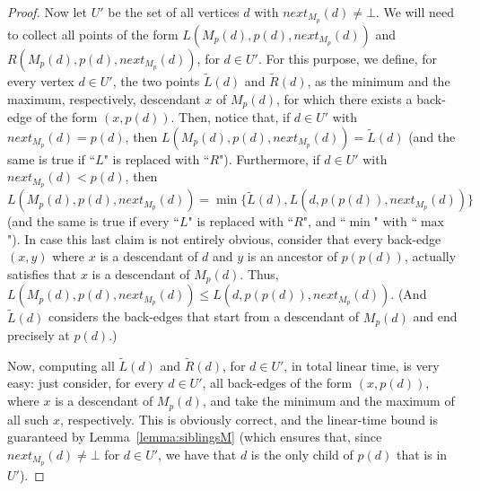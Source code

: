 \documentclass[11pt,a4paper]{article}
\begin{document}
\begin{proof}
Now let $U'$ be the set of all vertices $d$ with $\mathit{next}_{M_p}(d)\neq\bot$. We will need to collect all points of the form $L(M_p(d),p(d),\mathit{next}_{M_p}(d))$ and $R(M_p(d),p(d),\mathit{next}_{M_p}(d))$, for $d\in U'$. For this purpose, we define, for every vertex $d\in U'$, the two points $\widetilde{L}(d)$ and $\widetilde{R}(d)$, as the minimum and the maximum, respectively, descendant $x$ of $M_p(d)$, for which there exists a back-edge of the form $(x,p(d))$. Then, notice that, if $d\in U'$ with $\mathit{next}_{M_p}(d)=p(d)$, then $L(M_p(d),p(d),\mathit{next}_{M_p}(d))=\widetilde{L}(d)$ (and the same is true if  ``$L$" is replaced with ``$R$"). Furthermore, if $d\in U'$ with $\mathit{next}_{M_p}(d)<p(d)$, then $L(M_p(d),p(d),\mathit{next}_{M_p}(d))=\min\{\widetilde{L}(d), L(d,p(p(d)),\mathit{next}_{M_p}(d))\}$ (and the same is true if every ``$L$" is replaced with ``$R$", and ``$\min$" with ``$\max$"). In case this last claim is not entirely obvious, consider that every back-edge $(x,y)$ where $x$ is a descendant of $d$ and $y$ is an ancestor of $p(p(d))$, actually satisfies that $x$ is a descendant of $M_p(d)$. Thus, $L(M_p(d),p(d),\mathit{next}_{M_p}(d))\leq L(d,p(p(d)),\mathit{next}_{M_p}(d))$. (And $\widetilde{L}(d)$ considers the back-edges that start from a descendant of $M_p(d)$ and end precisely at $p(d)$.)

Now, computing all $\widetilde{L}(d)$ and $\widetilde{R}(d)$, for $d\in U'$, in total linear time, is very easy: just consider, for every $d\in U'$, all back-edges of the form $(x,p(d))$, where $x$ is a descendant of $M_p(d)$, and take the minimum and the maximum of all such $x$, respectively. This is obviously correct, and the linear-time bound is guaranteed by Lemma~\ref{lemma:siblingsM} (which ensures that, since $\mathit{next}_{M_p}(d)\neq\bot$ for $d\in U'$, we have that $d$ is the only child of $p(d)$ that is in $U'$). 


\end{proof}
\end{document}
